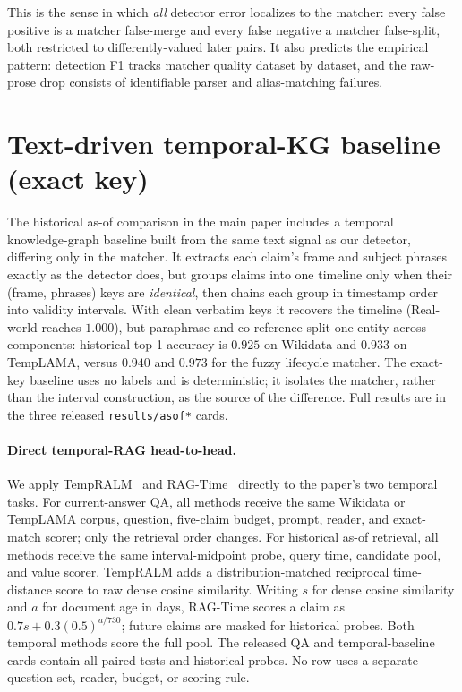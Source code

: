 \documentclass[letterpaper]{article}
\begin{document}
This is the sense in which \emph{all} detector error localizes to the matcher: every false positive is a matcher false-merge and every false negative a matcher false-split, both restricted to differently-valued later pairs. It also predicts the empirical pattern: detection F1 tracks matcher quality dataset by dataset, and the raw-prose drop consists of identifiable parser and alias-matching failures.

\section{Text-driven temporal-KG baseline (exact key)}
\label{sec:supp_exactkey}
The historical as-of comparison in the main paper includes a temporal knowledge-graph baseline built from the same text signal as our detector, differing only in the matcher. It extracts each claim's frame and subject phrases exactly as the detector does, but groups claims into one timeline only when their (frame, phrases) keys are \emph{identical}, then chains each group in timestamp order into validity intervals. With clean verbatim keys it recovers the timeline (Real-world reaches $1.000$), but paraphrase and co-reference split one entity across components: historical top-1 accuracy is $0.925$ on Wikidata and $0.933$ on TempLAMA, versus $0.940$ and $0.973$ for the fuzzy lifecycle matcher. The exact-key baseline uses no labels and is deterministic; it isolates the matcher, rather than the interval construction, as the source of the difference. Full results are in the three released \texttt{results/asof*} cards.

\paragraph{Direct temporal-RAG head-to-head.} We apply TempRALM~\citep{gade2024tempralm} and RAG-Time~\citep{grofsky2025ragtime} directly to the paper's two temporal tasks. For current-answer QA, all methods receive the same Wikidata or TempLAMA corpus, question, five-claim budget, prompt, reader, and exact-match scorer; only the retrieval order changes. For historical as-of retrieval, all methods receive the same interval-midpoint probe, query time, candidate pool, and value scorer. TempRALM adds a distribution-matched reciprocal time-distance score to raw dense cosine similarity. Writing $s$ for dense cosine similarity and $a$ for document age in days, RAG-Time scores a claim as $0.7s+0.3(0.5)^{a/730}$; future claims are masked for historical probes. Both temporal methods score the full pool. The released QA and temporal-baseline cards contain all paired tests and historical probes. No row uses a separate question set, reader, budget, or scoring rule.
\end{document}
